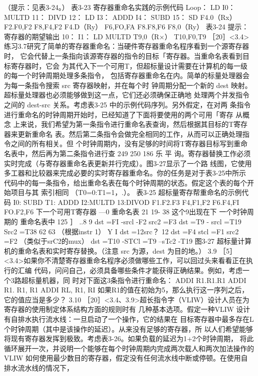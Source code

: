 （提示：见表3-24。）
表3-23 寄存器重命名实践的示例代码
Loop： LD
I0：
MULTD
11：
DIVD
12：
LD
I3：
ADDD
I4：
SUBD
15：
SD
F4.0（Rx）
F2.F0,F2
F8,F4,F2
F4.D（Ry）
F6,FO,FA
F8.F8,F6
F8,0（Ry）
表3-24 提示：寄存器的期望输出
10：
I1：
LD
MULTD
T9,0（R×）
T10,F0,T9
［20］<3.4>练习3.7研究了简单的寄存器重命名：当硬件寄存器重命名程序看到一个源寄存器时，
它会代替上一条指向该源寄存器的指令的目标「寄存器。当重命名表看到目标寄存器时，它会
为其代入下一个可用T，但超标量设计需要在计算机的每一级的每一个时钟周期处理多条指令，
包括寄存器重命名在内。简单的标量处理器会为每一条指令搜索 src 寄存器映射，并在每个时
钟周期分配一个新的 dest 映射。超标量处理器也必须能够做到这一点，它们还必须确保正确地
处理两个并发指令之间的 dest-src 关系。考虑表3-25 中的示例代码序列。另外假定，在对两
条指令进行重命名的时钟周期开始时，已经知道了下面将要使用的两个可用「寄存
从概念
上来说，我们希望为第一条指令进行重命名表查询，然后根据其目标的T寄存器来更新重命名
表。然后第二条指令会做完全相同的工作，从而可以正确处理指令之间的所有相关。但
个时钟周期内，没有足够的时间将T寄存器目标写到重命名表中，然后再为第二条指令进行查
249
250
186
乐 平
询。寄存器替换工作必须实时完成（与寄存器重命名表更新并行完成）。图3-27显示了一个路
线图，它使用多工器和比较器来完成必要的实时寄存器重命名。你的任务是对于表3-25中所示
代码中的每一条指令，给出重命名表在每个时钟周期的状态。假定这个表的每个开始项目与其
索引相同 （T0=0:T1=1，.）。
表3-25 超标量寄存帮重命名的示例代码
I0: SUBD
T1: ADDD
I2:MULTD
13:DIVOD
F1.F2.F3
F4,F1,F2
F6.F4,FI
FO.F2,F6
下一个可用T寄存器
—0
重命名表
21
19-
38
这个9出现在下
一个时钟周期的
重命名表中
125 ］
..8
9
dst =FI
-srcl -F2
src2 =F3
dst =T9
- srcl =T19
 Src2 =T38
62
63
（根据instr 1）
Y
I dst =12src？
12
dst =F4
stcl =F1
src2 =F2
（类似于srC2的mux）
dst =T10
-STCl =T9
--sTc2 -T19
图3-27 超标量计算机的重命名表和实时寄存替换。（注意 src 为源，dest 为目的地。）
3.9 ［5］<3.4>如果你不清楚寄存器重命名程序必须做哪些工作，可以回过头来看看正在执行的汇编
代码，问问自己，必须具备哪些条件才能获得正确结果。例如，考虑一个3路超标量机器，同
时对下面这3条指令进行重命名：
ADDI R1.R1.R1
ADDI R1. R1, R1
ADDI RL, R1, RI
如果R1的值在初始为5，那么执行这一序列之后，它的值应当是多少？
3.10
［20］<3.4、3.9>超长指令字（VLIW）设计人员在为寄存器的使用制定体系结构方面的规则时有
几种基本选项。假定一种VLIW 设计有自排水执行流水线：一旦启动了一个操作，它的结果在
目标寄存器中最多存在L个时钟周期（其中是该操作的延迟）。从来没有足够的寄存器，所
以人们希望能够将现有寄存器发挥到极致。考虑表3-26。如果负载的延迟为1+2个时钟周期，
将此循环展开一次，并说明一个能够在每个时钟周期内完成两次载人和两次加法操作的VLIW
如何使用最少数目的寄存器，假定没有任何流水线中断或停顿。在使用自排水流水线的情况下，
